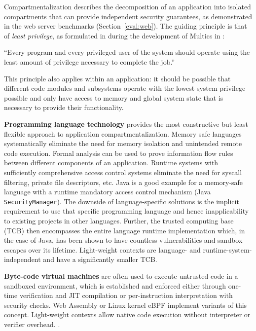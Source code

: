\documentclass[10pt,twocolumn,a4paper]{article}
\begin{document}
Compartmentalization describes the decomposition of an application into isolated compartments that can provide independent security guarantees, as demonstrated in the web server benchmarks (Section~\ref{eval:web}).
The guiding principle is that of \textit{least privilege}, as formulated in during the development of Multics in \citeyear{principleofleastprivilege}:%
\begin{displayquote}
\enquote{Every program and every privileged user of the system should operate using the least amount of privilege necessary to complete the job.}
\cite{principleofleastprivilege}
\end{displayquote}
This principle also applies within an application: it should be possible that different code modules and subsystems operate with the lowest system privilege possible and only have access to memory and global system state that is necessary to provide their functionality.

\textbf{Programming language technology} provides the most constructive but least flexible approach to application compartmentalization.
Memory safe languages systematically eliminate the need for memory isolation and unintended remote code execution.
Formal analysis can be used to prove information flow rules between different components of an application.
Runtime systems with sufficiently comprehensive access control systems eliminate the need for syscall filtering, private file descriptors, etc.
Java is a good example for a memory-safe language with a runtime mandatory access control mechanism (Java \lstinline{SecurityManager}).
The downside of language-specific solutions is the implicit requirement to use that specific programming language and hence inapplicability to existing projects in other languages.
Further, the trusted computing base (TCB) then encompasses the entire language runtime implementation which, in the case of Java, has been shown to have countless vulnerabilities and sandbox escapes over its lifetime.
Light-weight contexts are language- and runtime-system-independent and have a significantly smaller TCB.
\cite{javasecurity,bartel2018twentyyearsjavasecuritysandboxescape}

\textbf{Byte-code virtual machines} are often used to execute untrusted code in a sandboxed environment,
which is established and enforced either through one-time verification and JIT compilation or per-instruction interpretation with security checks.
Web Assembly or Linux kernel eBPF implement variants of this concept.
Light-weight contexts allow native code execution without interpreter or verifier overhead.
\cite{haas2017bringingwebassembly, lwnebpf}.
\end{document}
